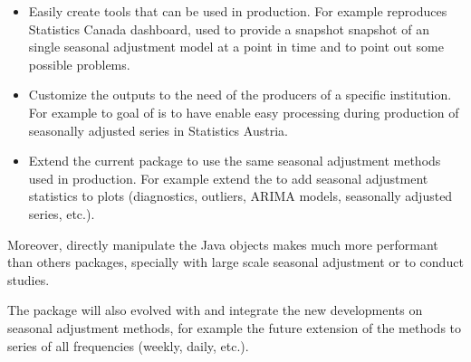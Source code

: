 \documentclass[article]{jss}
\providecommand{\tightlist}{%
  \setlength{\itemsep}{0pt}\setlength{\parskip}{0pt}}
\begin{document}
\begin{itemize}
\tightlist
\item
  Easily create tools that can be used in production. For example
   \citep{rjdqa} reproduces Statistics Canada dashboard, used
  to provide a snapshot snapshot of an single seasonal adjustment model
  at a point in time and to point out some possible problems.\\
\item
  Customize the outputs to the need of the producers of a specific
  institution. For example to goal of 
  \citep{persephone} is to have enable easy processing during production
  of seasonally adjusted series in Statistics Austria.\\
\item
  Extend the current  package to use the same seasonal
  adjustment methods used in production. For example 
  \citep{ggdemetra} extend the  \citep{ggplot2} to add
  seasonal adjustment statistics to plots (diagnostics, outliers, ARIMA
  models, seasonally adjusted series, etc.).
\end{itemize}

Moreover, directly manipulate the Java objects makes 
much more performant than others  packages, specially with
large scale seasonal adjustment or to conduct studies.

The package  will also evolved with 
and integrate the new developments on seasonal adjustment methods, for
example the future extension of the methods to series of all frequencies
(weekly, daily, etc.).

\renewcommand\refname{References}

\end{document}
